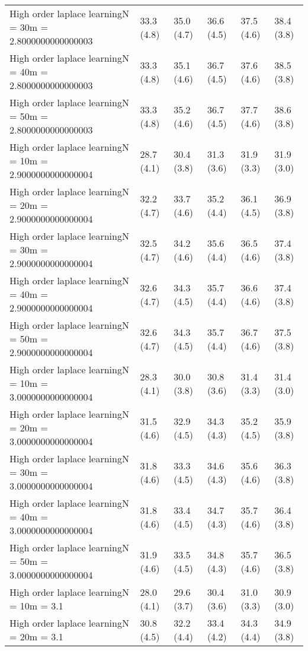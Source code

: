 \documentclass{article}
\begin{document}
\begin{table*}[t!]
\begin{center}
\begin{small}
\begin{sc}
\begin{tabular}{llllll}
High order laplace learningN = 30m = 2.8000000000000003&33.3 (4.8)      &35.0 (4.7)      &36.6 (4.5)      &37.5 (4.6)      &38.4 (3.8)      \\
High order laplace learningN = 40m = 2.8000000000000003&33.3 (4.8)      &35.1 (4.6)      &36.7 (4.5)      &37.6 (4.6)      &38.5 (3.8)      \\
High order laplace learningN = 50m = 2.8000000000000003&33.3 (4.8)      &35.2 (4.6)      &36.7 (4.5)      &37.7 (4.6)      &38.6 (3.8)      \\
High order laplace learningN = 10m = 2.9000000000000004&28.7 (4.1)      &30.4 (3.8)      &31.3 (3.6)      &31.9 (3.3)      &31.9 (3.0)      \\
High order laplace learningN = 20m = 2.9000000000000004&32.2 (4.7)      &33.7 (4.6)      &35.2 (4.4)      &36.1 (4.5)      &36.9 (3.8)      \\
High order laplace learningN = 30m = 2.9000000000000004&32.5 (4.7)      &34.2 (4.6)      &35.6 (4.4)      &36.5 (4.6)      &37.4 (3.8)      \\
High order laplace learningN = 40m = 2.9000000000000004&32.6 (4.7)      &34.3 (4.5)      &35.7 (4.4)      &36.6 (4.6)      &37.4 (3.8)      \\
High order laplace learningN = 50m = 2.9000000000000004&32.6 (4.7)      &34.3 (4.5)      &35.7 (4.4)      &36.7 (4.6)      &37.5 (3.8)      \\
High order laplace learningN = 10m = 3.0000000000000004&28.3 (4.1)      &30.0 (3.8)      &30.8 (3.6)      &31.4 (3.3)      &31.4 (3.0)      \\
High order laplace learningN = 20m = 3.0000000000000004&31.5 (4.6)      &32.9 (4.5)      &34.3 (4.3)      &35.2 (4.5)      &35.9 (3.8)      \\
High order laplace learningN = 30m = 3.0000000000000004&31.8 (4.6)      &33.3 (4.5)      &34.6 (4.3)      &35.6 (4.6)      &36.3 (3.8)      \\
High order laplace learningN = 40m = 3.0000000000000004&31.8 (4.6)      &33.4 (4.5)      &34.7 (4.3)      &35.7 (4.6)      &36.4 (3.8)      \\
High order laplace learningN = 50m = 3.0000000000000004&31.9 (4.6)      &33.5 (4.5)      &34.8 (4.3)      &35.7 (4.6)      &36.5 (3.8)      \\
High order laplace learningN = 10m = 3.1&28.0 (4.1)      &29.6 (3.7)      &30.4 (3.6)      &31.0 (3.3)      &30.9 (3.0)      \\
High order laplace learningN = 20m = 3.1&30.8 (4.5)      &32.2 (4.4)      &33.4 (4.2)      &34.3 (4.4)      &34.9 (3.8)      \\

\end{tabular}
\end{sc}
\end{small}
\end{center}
\end{table*}
\end{document}
